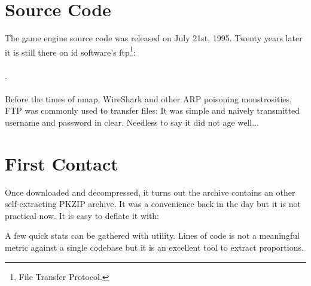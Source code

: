 \documentclass[book.tex]{subfiles}
\begin{document}
\section{Source Code}
The game engine source code was released on July 21st, 1995. Twenty years later it is still there on id software's ftp\footnote{File Transfer Protocol.}:\\ 
\\.\\
\\
 Before the times of nmap, WireShark and other ARP poisoning monstrosities, FTP was commonly used to transfer files: It was simple and naively transmitted username and password in clear. Needless to say it did not age well...\\

\section{First Contact}
Once downloaded and decompressed, it turns out the archive  contains an other self-extracting PKZIP archive. It was a convenience back in the day but it is not practical now. It is easy to deflate it with:\\
\par
\begin{minipage}{\textwidth}

\end{minipage}
\par
A few quick stats can be gathered with  utility. Lines of code is not a meaningful metric against a single codebase but it is an excellent tool to extract proportions.\\

\par
\begin{minipage}{\textwidth}

\end{minipage}
\end{document}
